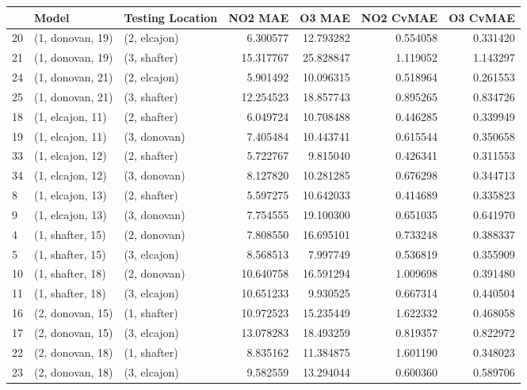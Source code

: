 \begin{tabular}{lllrrrr}
\toprule
{} &             Model & Testing Location &    NO2 MAE &     O3 MAE &  NO2 CvMAE &  O3 CvMAE \\
\midrule
20 &  (1, donovan, 19) &     (2, elcajon) &   6.300577 &  12.793282 &   0.554058 &  0.331420 \\
21 &  (1, donovan, 19) &     (3, shafter) &  15.317767 &  25.828847 &   1.119052 &  1.143297 \\
24 &  (1, donovan, 21) &     (2, elcajon) &   5.901492 &  10.096315 &   0.518964 &  0.261553 \\
25 &  (1, donovan, 21) &     (3, shafter) &  12.254523 &  18.857743 &   0.895265 &  0.834726 \\
18 &  (1, elcajon, 11) &     (2, shafter) &   6.049724 &  10.708488 &   0.446285 &  0.339949 \\
19 &  (1, elcajon, 11) &     (3, donovan) &   7.405484 &  10.443741 &   0.615544 &  0.350658 \\
33 &  (1, elcajon, 12) &     (2, shafter) &   5.722767 &   9.815040 &   0.426341 &  0.311553 \\
34 &  (1, elcajon, 12) &     (3, donovan) &   8.127820 &  10.281285 &   0.676298 &  0.344713 \\
8  &  (1, elcajon, 13) &     (2, shafter) &   5.597275 &  10.642033 &   0.414689 &  0.335823 \\
9  &  (1, elcajon, 13) &     (3, donovan) &   7.754555 &  19.100300 &   0.651035 &  0.641970 \\
4  &  (1, shafter, 15) &     (2, donovan) &   7.808550 &  16.695101 &   0.733248 &  0.388337 \\
5  &  (1, shafter, 15) &     (3, elcajon) &   8.568513 &   7.997749 &   0.536819 &  0.355909 \\
10 &  (1, shafter, 18) &     (2, donovan) &  10.640758 &  16.591294 &   1.009698 &  0.391480 \\
11 &  (1, shafter, 18) &     (3, elcajon) &  10.651233 &   9.930525 &   0.667314 &  0.440504 \\
16 &  (2, donovan, 15) &     (1, shafter) &  10.972523 &  15.235449 &   1.622332 &  0.468058 \\
17 &  (2, donovan, 15) &     (3, elcajon) &  13.078283 &  18.493259 &   0.819357 &  0.822972 \\
22 &  (2, donovan, 18) &     (1, shafter) &   8.835162 &  11.384875 &   1.601190 &  0.348023 \\
23 &  (2, donovan, 18) &     (3, elcajon) &   9.582559 &  13.294044 &   0.600360 &  0.589706 \\

\end{tabular}
